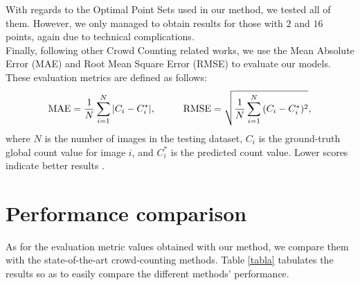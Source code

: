 With regards to the Optimal Point Sets used in our method, we tested all of them. However, we only managed to obtain results for those with $2$ and $16$ points, again due to technical complications.\\

Finally, following other Crowd Counting related works, we use the Mean Absolute Error (MAE) and Root Mean Square Error (RMSE) to evaluate our models. These evaluation metrics are defined as follows:
$$ \text{MAE} = \frac{1}{N} \sum_{i=1}^{N}{\lvert C_i - C_i^*\rvert}, \hspace{1cm} \text{RMSE} = \sqrt{\frac{1}{N} \sum_{i=1}^{N}{(C_i - C_i^*)^2}}, $$
where $N$ is the number of images in the testing dataset, $C_i$ is the ground-truth global count value for image $i$, and $C_i^*$ is the predicted count value. 
Lower scores indicate better results \citep{CLIP}.\\


\section{Performance comparison}
As for the evaluation metric values obtained with our method, we compare them with the state-of-the-art crowd-counting methods. Table \ref{tabla} tabulates the results so as to easily compare the different methods' performance.\vspace{6cm}

